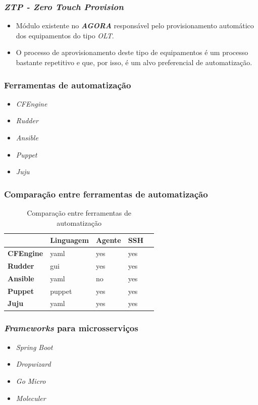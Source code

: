 \begin{frame}
    \frametitle{\textit{ZTP - Zero Touch Provision}}
    \begin{itemize}
        \item Módulo existente no \textit{\textbf{AGORA}} responsável pelo
        provisionamento automático dos equipamentos do tipo \textit{OLT}.
        \item O processo de aprovisionamento deste tipo de equipamentos é um
        processo bastante repetitivo e que, por isso, é um alvo preferencial de
        automatização.
    \end{itemize}    
\end{frame}    

\begin{frame}
    \frametitle{Ferramentas de automatização}
    \begin{itemize}
        \item \textit{CFEngine}
        \item \textit{Rudder}
        \item \textit{Ansible}
        \item \textit{Puppet}
        \item \textit{Juju}
    \end{itemize}    
\end{frame}    

\begin{frame}
    \frametitle{Comparação entre ferramentas de automatização}
    \begin{table}[H]
        \centering
        \begin{tabular}{lllll}
          \hline
                            & \textbf{Linguagem} & \textbf{Agente} & \textbf{SSH}  \\ \hline
          \textbf{CFEngine} & yaml               & yes              & yes          \\ \hline
          \textbf{Rudder}   & gui                & yes              & yes          \\ \hline
          \textbf{Ansible}  & yaml               & no               & yes          \\ \hline
          \textbf{Puppet}   & puppet             & yes              & yes          \\ \hline
          \textbf{Juju}     & yaml               & yes              & yes          \\ \hline
        \end{tabular}
        \caption{Comparação entre ferramentas de automatização}
        \label{tab:automation_tools_comparison}
      \end{table}
\end{frame}    

\begin{frame}
    \frametitle{\textit{Frameworks} para microsserviços}
    \begin{itemize}
        \item \textit{Spring Boot}
        \item \textit{Dropwizard}
        \item \textit{Go Micro}
        \item \textit{Moleculer}
    \end{itemize}    
\end{frame} 